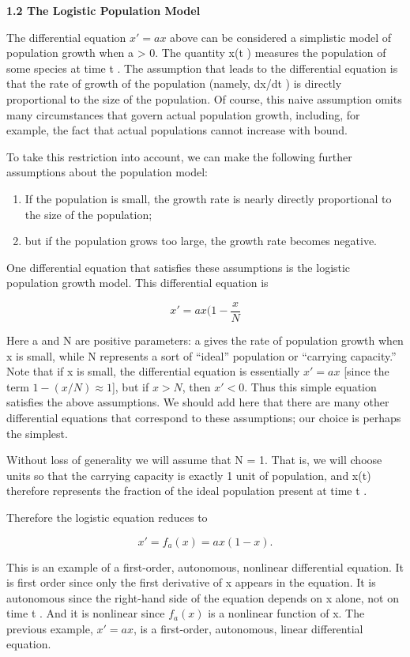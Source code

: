 \documentclass{article}
\begin{document}
\textbf{1.2 The Logistic Population Model}

\hfill

The differential equation $x'= ax$ above can be considered a simplistic model
of population growth when a > 0. The quantity x(t ) measures the population
of some species at time t . The assumption that leads to the differential equation
is that the rate of growth of the population (namely, dx/dt ) is directly
proportional to the size of the population. Of course, this naive assumption
omits many circumstances that govern actual population growth, including,
for example, the fact that actual populations cannot increase with bound.

To take this restriction into account, we can make the following further
assumptions about the population model:

\begin{enumerate}
\item If the population is small, the growth rate is nearly directly proportional
to the size of the population;
\item but if the population grows too large, the growth rate becomes negative.
\end{enumerate}

One differential equation that satisfies these assumptions is the logistic
population growth model. This differential equation is

\[
x' = ax (1 - \frac{x}{N}
\]

Here a and N are positive parameters: a gives the rate of population growth
when x is small, while N represents a sort of “ideal” population or “carrying
capacity.” Note that if x is small, the differential equation is essentially $x' = ax$
[since the term $1-(x/N) \approx 1$], but if $x > N$, then $x'< 0$. Thus this simple
equation satisfies the above assumptions. We should add here that there are
many other differential equations that correspond to these assumptions; our
choice is perhaps the simplest.

Without loss of generality we will assume that N = 1. That is, we will
choose units so that the carrying capacity is exactly 1 unit of population, and
x(t) therefore represents the fraction of the ideal population present at time t .

Therefore the logistic equation reduces to

\[
x' = f_a(x) = ax(1 - x).
\]

This is an example of a first-order, autonomous, nonlinear differential equation.
It is first order since only the first derivative of x appears in the equation.
It is autonomous since the right-hand side of the equation depends on x alone,
not on time t . And it is nonlinear since $f_a(x)$ is a nonlinear function of x. The
previous example, $x'= ax$, is a first-order, autonomous, linear differential
equation.
\end{document}
